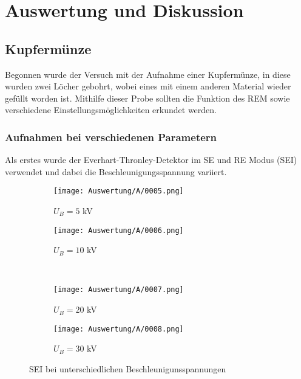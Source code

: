 
\chapter{Auswertung und Diskussion}
\label{chap:versuchsauswertung}

\section{Kupfermünze}
Begonnen wurde der Versuch mit der Aufnahme einer Kupfermünze, in diese wurden zwei Löcher gebohrt, wobei eines mit einem anderen Material wieder gefüllt worden ist. Mithilfe dieser Probe sollten die Funktion des REM sowie verschiedene Einstellungsmöglichkeiten erkundet werden.

\newpage
\subsection{Aufnahmen bei verschiedenen Parametern}
Als erstes wurde der Everhart-Thronley-Detektor im SE und RE Modus (SEI) verwendet und dabei die Beschleunigungsspannung variiert.

\begin{figure}[h]
    \centering
    
    \begin{subfigure}[b]{0.45\textwidth}
        \centering
        \texttt{[image: Auswertung/A/0005.png]}
        \caption{$U_B = 5$ kV}
    \end{subfigure}
    \hfill
    \begin{subfigure}[b]{0.45\textwidth}
        \centering
        \texttt{[image: Auswertung/A/0006.png]}
        \caption{$U_B = 10$ kV}
    \end{subfigure}
    \\
    \begin{subfigure}[b]{0.45\textwidth}
        \centering
        \texttt{[image: Auswertung/A/0007.png]}
        \caption{$U_B = 20$ kV}
    \end{subfigure}
    \hfill
    \begin{subfigure}[b]{0.45\textwidth}
        \centering
        \texttt{[image: Auswertung/A/0008.png]}
        \caption{$U_B = 30$ kV}
    \end{subfigure}
    \caption{SEI bei unterschiedlichen Beschleunigunsspannungen}
\end{figure}

